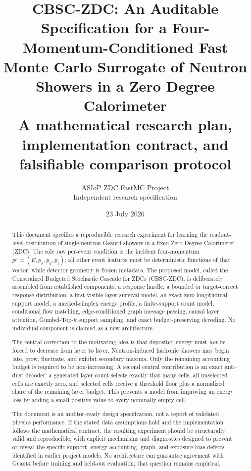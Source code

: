 \documentclass[11pt]{article}
\title{\textbf{CBSC-ZDC: An Auditable Specification for a Four-Momentum-Conditioned Fast Monte Carlo Surrogate of Neutron Showers in a Zero Degree Calorimeter}\\[0.7em]
\large A mathematical research plan, implementation contract, and falsifiable comparison protocol}
\author{ASIoP ZDC FastMC Project\\Independent research specification}
\date{23 July 2026}
\theoremstyle{definition}
\theoremstyle{remark}
\begin{document}
\maketitle

\begin{abstract}
This document specifies a reproducible research experiment for learning the readout-level distribution of single-neutron Geant4 showers in a fixed Zero Degree Calorimeter (ZDC). The sole raw per-event condition is the incident four-momentum $p^\mu=(E,p_x,p_y,p_z)$; all other event features must be deterministic functions of that vector, while detector geometry is frozen metadata. The proposed model, called the Constrained Budgeted Stochastic Cascade for ZDCs (CBSC-ZDC), is deliberately assembled from established components: a response hurdle, a bounded or target-correct response distribution, a first-visible-layer survival model, an exact-zero longitudinal support model, a masked-simplex energy profile, a finite-support count model, conditional flow matching, edge-conditioned graph message passing, causal layer attention, Gumbel-Top-$k$ support sampling, and exact budget-preserving decoding. No individual component is claimed as a new architecture.

The central correction to the motivating idea is that deposited energy must \emph{not} be forced to decrease from layer to layer. Neutron-induced hadronic showers may begin late, grow, fluctuate, and exhibit secondary maxima. Only the remaining accounting budget is required to be non-increasing. A second central contribution is an exact anti-dust decoder: a generated layer count selects exactly that many cells, all unselected cells are exactly zero, and selected cells receive a threshold floor plus a normalized share of the remaining layer budget. This prevents a model from improving an energy loss by adding a small positive value to every nominally empty cell.

The document is an auditor-ready design specification, not a report of validated physics performance. If the stated data assumptions hold and the implementation follows the mathematical contract, the resulting experiment should be structurally valid and reproducible, with explicit mechanisms and diagnostics designed to prevent or reveal the specific support, energy-accounting, graph, and exposure-bias defects identified in earlier project models. No architecture can guarantee agreement with Geant4 before training and held-out evaluation; that question remains empirical.
\end{abstract}
\end{document}
